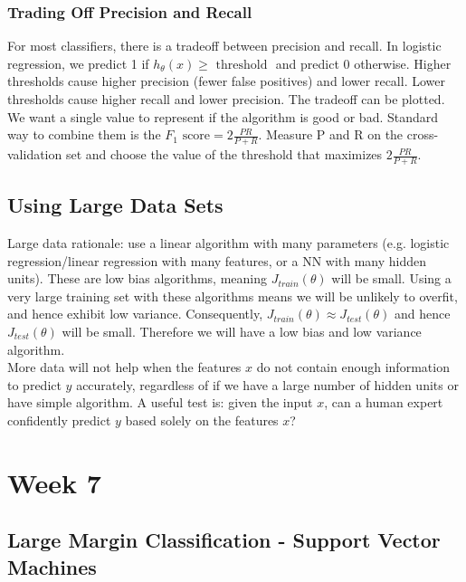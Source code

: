 \documentclass[11pt,letterpaper]{article}
\begin{document}
\subsubsection{Trading Off Precision and Recall}
For most classifiers, there is a tradeoff between precision and recall. In logistic regression, we predict 1 if $h_\theta(x) \geq \textrm{ threshold }$ and predict 0 otherwise. Higher thresholds cause higher precision (fewer false positives) and lower recall. Lower thresholds cause higher recall and lower precision. The tradeoff can be plotted.\\
We want a single value to represent if the algorithm is good or bad. Standard way to combine them is the $F_1 \textrm{ score} = 2\frac{PR}{P+R}$. Measure P and R on the cross-validation set and choose the value of the threshold that maximizes $2\frac{PR}{P+R}$.
\subsection{Using Large Data Sets}
Large data rationale: use a linear algorithm with many parameters (e.g. logistic regression/linear regression with many features, or a NN with many hidden units). These are low bias algorithms, meaning $J_{train}(\theta)$ will be small. Using a very large training set with these algorithms means we will be unlikely to overfit, and hence exhibit low variance. Consequently, $J_{train}(\theta) \approx J_{test}(\theta)$ and hence $J_{test}(\theta)$ will be small. Therefore we will have a low bias and low variance algorithm.\\
More data will not help when the features $x$ do not contain enough information to predict $y$ accurately, regardless of if we have a large number of hidden units or have simple algorithm. A useful test is: given the input $x$, can a human expert confidently predict $y$ based solely on the features $x$?

\section{Week 7}
\subsection{Large Margin Classification - Support Vector Machines}
\end{document}
